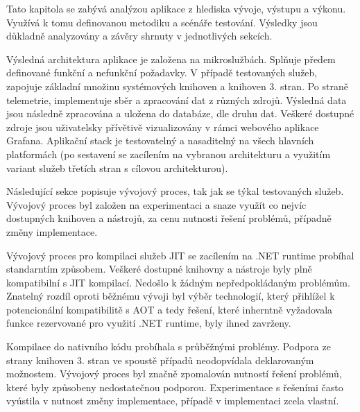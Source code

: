 
Tato kapitola se zabývá analýzou aplikace z hlediska vývoje, výstupu a výkonu. Využívá k tomu definovanou metodiku a scénáře testování. Výsledky jsou důkladně analyzovány a závěry shrnuty v jednotlivých sekcích.


Výsledná architektura aplikace je založena na mikroslužbách. Splňuje předem definované funkční a nefunkční požadavky. V případě testovaných služeb, zapojuje základní množinu systémových knihoven a knihoven 3. stran. Po straně telemetrie, implementuje sběr a zpracování dat z různých zdrojů. Výsledná data jsou následně zpracována a uložena do databáze, dle druhu dat. Veškeré dostupné zdroje jsou uživatelsky přívětivě vizualizovány v rámci webového aplikace Grafana. Aplikační stack je testovatelný a nasaditelný na všech hlavních platformách (po sestavení se zacílením na vybranou architekturu a využitím variant služeb třetích stran s cílovou architekturou).



Následující sekce popisuje vývojový proces, tak jak se týkal testovaných služeb. Vývojový proces byl založen na experimentaci a snaze využít co nejvíc dostupných knihoven a nástrojů, za cenu nutnosti řešení problémů, případně změny implementace.



Vývojový proces pro kompilaci služeb JIT se zacílením na .NET runtime probíhal standarntím způsobem. Veškeré dostupné knihovny a nástroje byly plně kompatibilní s JIT kompilací. Nedošlo k žádným nepředpokládaným problémům. Znatelný rozdíl oproti běžnému vývoji byl výběr technologií, který přihlížel k potencionální kompatibilitě s AOT a tedy řešení, které inherntně vyžadovala funkce rezervované pro využití .NET runtime, byly ihned zavrženy.


Kompilace do nativního kódu probíhala s průběžnými problémy. Podpora ze strany knihoven 3. stran ve spoustě případů neodopvídala deklarovaným možnostem. Vývojový proces byl značně zpomalován nutností řešení problémů, které byly způsobeny nedostatečnou podporou. Experimentace s řešeními často vyústila v nutnost změny implementace, případě v implementaci zcela vlastní.


